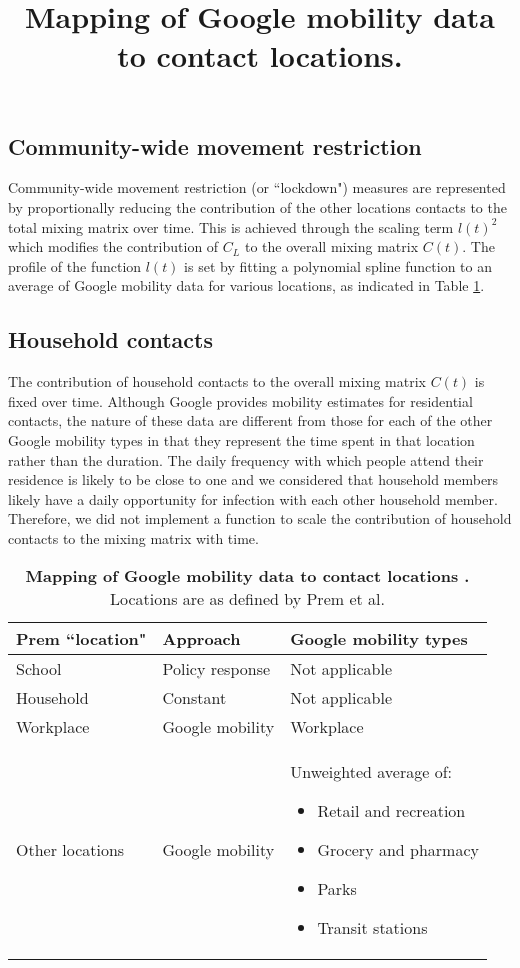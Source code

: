 \subsection{Community-wide movement restriction}
Community-wide movement restriction (or ``lockdown") measures are represented by proportionally reducing the contribution of the other locations contacts to the total mixing matrix over time. This is achieved through the scaling term \(l(t)^{2}\) which modifies the contribution of \(C_{L}\) to the overall mixing matrix \(C(t)\). The profile of the function \(l(t)\) is set by fitting a polynomial spline function to an average of Google mobility data for various locations, as indicated in Table \ref{tab:mobility_map}.

\subsection{Household contacts}
The contribution of household contacts to the overall mixing matrix \(C(t)\) is fixed over time. Although Google provides mobility estimates for residential contacts, the nature of these data are different from those for each of the other Google mobility types in that they represent the time spent in that location rather than the duration. The daily frequency with which people attend their residence is likely to be close to one and we considered that household members likely have a daily opportunity for infection with each other household member. Therefore, we did not implement a function to scale the contribution of household contacts to the mixing matrix with time.

\begin{table}[ht]
\renewcommand{\baselinestretch}{1}
    \begin{tabular}{| p{4.4cm} | p{4.4cm} | p{5cm} |}
        \hline
        \textbf{Prem ``location"} & \textbf{Approach} & \textbf{Google mobility types} \\
        \hline
        School & Policy response & Not applicable \\
      \hline
      Household & Constant & Not applicable \\
      \hline
      Workplace & Google mobility & Workplace \\
      \hline
      Other locations & Google mobility & 
      Unweighted average of: \begin{itemize}
			\item Retail and recreation
          \item Grocery and pharmacy
          \item Parks
          \item Transit stations
      \end{itemize}\\
      \hline
    \end{tabular}
    \title{Mapping of Google mobility data to contact locations.}
    \caption{\textbf{Mapping of Google mobility data to contact locations .} Locations are as defined by Prem et al. \cite{RN19}}
    \label{tab:mobility_map}
\end{table}


